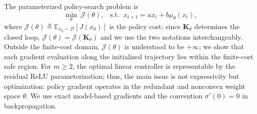 \documentclass[letterpaper, 10 pt, conference]{ieeeconf}
\newcommand{\E}{\mathbb{E}}
\newcommand{\bK}{\mathbf{K}}
\newcommand{\cD}{\mathcal{D}}
\newcommand{\cJ}{\mathcal{J}}
\DeclareMathOperator*{\st}{s.t.}
\begin{document}
The parameterized policy-search problem is
\begin{equation} \label{eq_rl_theta_problem}
    \underset{\theta}{\min}
     \ \cJ(\theta),
    \;\;
    \st \;  x_{t+1} = ax_{t} + b\mu_{\theta}(x_{t}),
\end{equation}
where $\cJ(\theta) \triangleq \E_{x_{0} \sim \cD}[J(x_0)]$ is the policy cost; since $\bK_{\theta}$ determines the closed loop, $\cJ(\theta) = \cJ(\bK_{\theta})$ and we use the two notations interchangeably. Outside the finite-cost domain, $\cJ(\theta)$ is understood to be $+\infty$; we show that each gradient evaluation along the initialized trajectory lies within the finite-cost safe region. For $m\ge2$, the optimal linear controller is representable by the residual ReLU parameterization; thus, the main issue is not expressivity but optimization: policy gradient operates in the redundant and nonconvex weight space $\theta$. We use exact model-based gradients and the convention $\sigma'(0)=0$ in backpropagation. 
 
\end{document}
